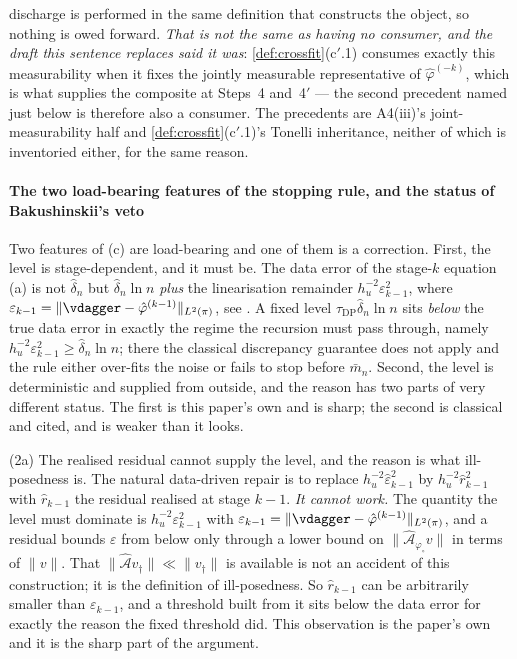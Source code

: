 discharge is performed in the same definition that constructs the object, so nothing is owed forward.
\emph{That is not the same as having no consumer, and the draft this sentence replaces said it
was}: \cref{def:crossfit}\textup{(c$'$.1)} consumes exactly this measurability when it fixes the
jointly measurable representative of $\hat\varphi^{(-k)}$, which is what supplies the composite at
 Steps~4 and~4$'$ --- the second precedent named just below is therefore
also a consumer. The precedents are A4(iii)'s joint-measurability half and
\cref{def:crossfit}\textup{(c$'$.1)}'s Tonelli inheritance, neither of which is inventoried either, for the
same reason.

\paragraph{The two load-bearing features of the stopping rule, and the status of Bakushinskii's veto}

Two features of (c) are load-bearing and one of them is a correction. First, the level is
stage-dependent, and it must be. The data error of the stage-$k$ equation (a) is not $\hat\delta_n$
but $\hat\delta_n\ln n$ \emph{plus} the linearisation remainder $h_u^{-2}\varepsilon_{k-1}^{2}$, where
$\varepsilon_{k-1}=\|\vdagger-\hat\varphi^{(k-1)}\|_{L^{2}(\pi)}$, see . A
fixed level $\tau_{\mathrm{DP}}\hat\delta_n\ln n$ sits
\emph{below} the true data error in exactly the regime the recursion must pass through, namely
$h_u^{-2}\varepsilon_{k-1}^{2}\ge\hat\delta_n\ln n$; there the classical discrepancy guarantee does not
apply and the rule either over-fits the noise or fails to stop before $\bar m_n$.
Second, the level is deterministic and supplied from outside, and the reason has two parts of
very different status. The first is this paper's own and is sharp; the second is classical and cited,
and is weaker than it looks.

(2a) The realised residual cannot supply the level, and the reason is what ill-posedness is. The
natural data-driven repair is to replace $h_u^{-2}\hat\varepsilon_{k-1}^{2}$ by
$h_u^{-2}\hat r_{k-1}^{2}$ with $\hat r_{k-1}$ the residual realised at stage $k-1$. \emph{It cannot
work.} The quantity the level must dominate is $h_u^{-2}\varepsilon_{k-1}^{2}$ with
$\varepsilon_{k-1}=\|\vdagger-\hat\varphi^{(k-1)}\|_{L^{2}(\pi)}$, and a residual bounds $\varepsilon$
from below only through a lower bound on $\|\hat{\mathcal A}_{\varphi_\circ}v\|$ in terms of $\|v\|$.
That $\|\hat{\mathcal A}v_\dagger\|\ll\|v_\dagger\|$ is available is not an accident of this
construction; it is the definition of ill-posedness. So $\hat r_{k-1}$ can be arbitrarily smaller than
$\varepsilon_{k-1}$, and a threshold built from it sits below the data error for exactly the reason the
fixed threshold did. This observation is the paper's own and it is the sharp part of the
argument.

